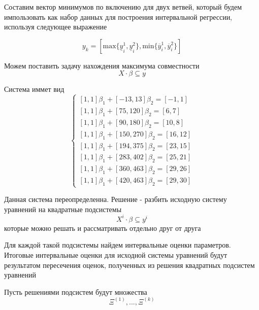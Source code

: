 \documentclass[12pt,a4paper]{article}
\begin{document}
        Составим вектор минимумов по включению для двух ветвей, который будем импользовать как набор данных для построения интервальной регрессии, используя следующее выражение
        
        \begin{equation}
            y_k = [\text{max}\{\underline{y}_{i}^{1}, \underline{y}_{i}^{2}\}, \text{min}\{\overline{y}_{i}^{1}, \overline{y}_{i}^{2}\}]
        \end{equation}
        
        Можем поставить задачу нахождения максимума совместности 
        \begin{equation}\label{eq:problem}
            X \cdot \beta \subseteq y
        \end{equation}
        
        Система иммет вид
        \begin{equation}\label{main_system}
            \begin{cases}
              [1, 1]\beta_{1} + [-13, 13]\beta_{2} = [-1, 1] \\
              [1, 1]\beta_{1} + [75, 120]\beta_{2} = [6, 7] \\
              [1, 1]\beta_{1} + [90, 180]\beta_{2} = [10, 8] \\
              [1, 1]\beta_{1} + [150, 270]\beta_{2} = [16, 12] \\
              [1, 1]\beta_{1} + [194, 375]\beta_{2} = [23, 15] \\
              [1, 1]\beta_{1} + [283, 402]\beta_{2} = [25, 21] \\
              [1, 1]\beta_{1} + [360, 463]\beta_{2} = [29, 26] \\
              [1, 1]\beta_{1} + [420, 463]\beta_{2} = [29, 30] 
            \end{cases}
        \end{equation}
        
        Данная система переопределенна. Решение - разбить исходную систему уравнений на квадратные подсистемы
        $$
            X^{i} \cdot \beta \subseteq y^{i}
        $$
        которые можно решать и рассматривать отдельно друг от друга
        
        Для каждой такой подсистемы найдем интервальные оценки параметров. Итоговые интервальные оценки для исходной системы уравнений будут результатом пересечения оценок, полученных из решения квадратных подсистем уравнений
        
        Пусть решениями подсистем будут множества 
        $$
            \Xi^{(1)}, ... , \Xi^{(k)}
        $$
        
\end{document}
